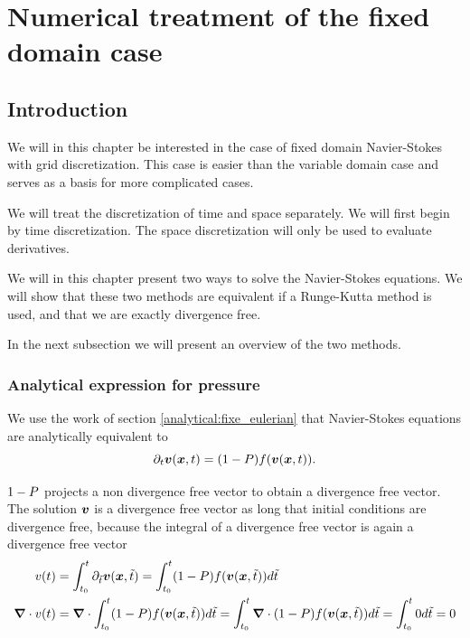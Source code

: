 \chapter{Numerical treatment of the fixed domain case}
\minitoc

\section{Introduction}

We will in this chapter be interested in the case of fixed domain Navier-Stokes with grid discretization.
This case is easier than the variable domain case and serves as a basis for more complicated cases.

We will treat the discretization of time and space separately.
We will first begin by time discretization.
The space discretization will only be used to evaluate derivatives.

We will in this chapter present two ways to solve the Navier-Stokes equations.
We will show that these two methods are equivalent if a Runge-Kutta method is used,
and that we are exactly divergence free.

In the next subsection we will present an overview of the two methods.

\subsection{Analytical expression for pressure}
\label{fixed:analytical}

We use the work of section \ref{analytical:fixe_eulerian} that Navier-Stokes equations are analytically equivalent to
\begin{equation}
  \partial_t {\boldsymbol {v}}({\boldsymbol {x}} ,t)=(1-P)f({\boldsymbol {v}}({\boldsymbol {x}},t)).
\end{equation}

$1-P$ projects a non divergence free vector to obtain a divergence free vector.
The solution ${\boldsymbol {v}}$ is a divergence free vector as long that initial conditions are divergence free, because the integral of a divergence free vector is again a divergence free vector
\begin{align*}
 v(t)&=\int_{t_0}^{t}\partial_{\tilde{t}} {\boldsymbol {v}}({\boldsymbol {x}} ,\tilde{t})=\int_{t_0}^{t} (1-P)f({\boldsymbol {v}}({\boldsymbol {x}},\tilde{t})) d\tilde{t}\\
 {\boldsymbol {\nabla}}\cdot v(t)&= {\boldsymbol {\nabla}}\cdot\int_{t_0}^{t} (1-P)f({\boldsymbol {v}}({\boldsymbol {x}},\tilde{t})) d\tilde{t}=\int_{t_0}^{t} {\boldsymbol {\nabla}}\cdot(1-P)f({\boldsymbol {v}}({\boldsymbol {x}},\tilde{t})) d\tilde{t}=\int_{t_0}^{t} 0 d\tilde{t}=0
\end{align*}


